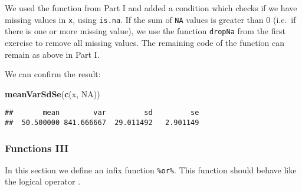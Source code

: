 \documentclass[11,]{article}
\newenvironment{Shaded}{\begin{snugshade}}{\end{snugshade}}
\newcommand{\KeywordTok}[1]{\textcolor[rgb]{0.13,0.29,0.53}{\textbf{{#1}}}}
\newcommand{\DecValTok}[1]{\textcolor[rgb]{0.00,0.00,0.81}{{#1}}}
\newcommand{\StringTok}[1]{\textcolor[rgb]{0.31,0.60,0.02}{{#1}}}
\newcommand{\CommentTok}[1]{\textcolor[rgb]{0.56,0.35,0.01}{\textit{{#1}}}}
\newcommand{\OtherTok}[1]{\textcolor[rgb]{0.56,0.35,0.01}{{#1}}}
\newcommand{\NormalTok}[1]{{#1}}
\begin{document}
We used the function from Part I and added a condition which checks if
we have missing values in \texttt{x}, using \texttt{is.na}. If the sum
of \texttt{NA} values is greater than \(0\) (i.e.~if there is one or
more missing value), we use the function \texttt{dropNa} from the first
exercise to remove all missing values. The remaining code of the
function can remain as above in Part I.

We can confirm the result:

\begin{Shaded}
\begin{Highlighting}[]
\KeywordTok{meanVarSdSe}\NormalTok{(}\KeywordTok{c}\NormalTok{(x, }\OtherTok{NA}\NormalTok{))}
\end{Highlighting}
\end{Shaded}

\begin{verbatim}
##       mean        var         sd         se 
##  50.500000 841.666667  29.011492   2.901149
\end{verbatim}

\subsubsection{Functions III}\label{functions-iii}

In this section we define an infix function \texttt{\%or\%}. This
function should behave like the logical operator \texttt{\textbar{}}.

\begin{Shaded}
\end{Shaded}
\end{document}
